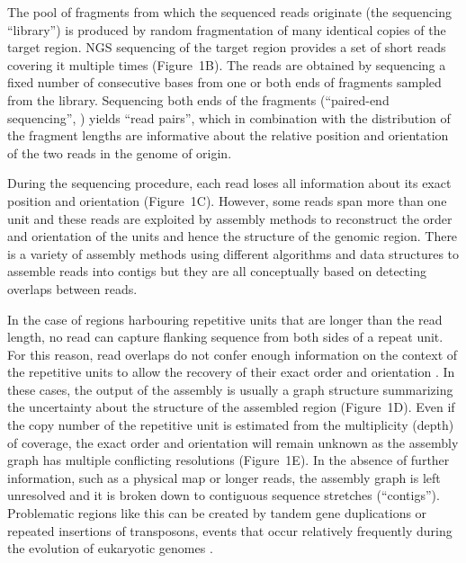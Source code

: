 \documentclass[10pt]{article}
\newcommand{\blue}[1]{{\color{blue} #1}}
\begin{document}
The pool of fragments from which the sequenced reads originate (the sequencing ``library'') is produced by random fragmentation of many identical copies of the target region. NGS sequencing of the target region provides a set of short reads covering it multiple times (Figure~1B). The reads are obtained by sequencing a fixed number of consecutive bases from one or both ends of fragments sampled from the library. Sequencing both ends of the fragments (``paired-end sequencing'', \cite{Treangen11}) yields ``read pairs'', which in combination with the distribution of the fragment lengths are informative about the relative position and orientation of the two reads in the genome of origin.

During the sequencing procedure, each read loses all information about its exact position and orientation (Figure~1C). 
However, some reads span more than one unit and these reads are exploited by assembly methods to reconstruct the order and orientation of the units \cite{Flicek2009} and hence the structure of the genomic region. There is a variety of assembly methods using different algorithms and data structures to assemble reads into contigs \cite{Miller10,Flicek2009,Zerbino2008,Paszkiewicz10} but they are all conceptually based on detecting overlaps between reads.

In the case of regions harbouring repetitive units that are longer than the read length, no read can capture flanking sequence from both sides of a repeat unit. For this reason, read overlaps do not confer enough information on the context of the repetitive units to allow the recovery of their exact order and orientation \cite{Treangen11, Flicek2009}.
In these cases, the output of the assembly is usually a graph structure summarizing the uncertainty about the structure of the assembled region (Figure~1D).
Even if the copy number of the repetitive unit is estimated from the multiplicity (depth) of coverage, the exact order and orientation will remain unknown as the assembly graph has multiple conflicting resolutions (Figure~1E). In the absence of further information, such as a physical map or longer reads, the assembly graph is left unresolved and it is broken down to contiguous sequence stretches (``contigs'').
Problematic regions like this can be created by \blue{tandem gene duplications or repeated insertions of transposons}, events that occur relatively frequently during the evolution of eukaryotic genomes \cite{Wessler06, Zhang03}.
\end{document}
